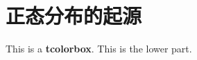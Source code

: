 \section{正态分布的起源}

\begin{tcolorbox}[
    fonttitle = \bfseries, fontupper = \sffamily, fontlower = \itshape]
    This is a \textbf{tcolorbox}.
    \tcblower
    This is the lower part.
\end{tcolorbox}




